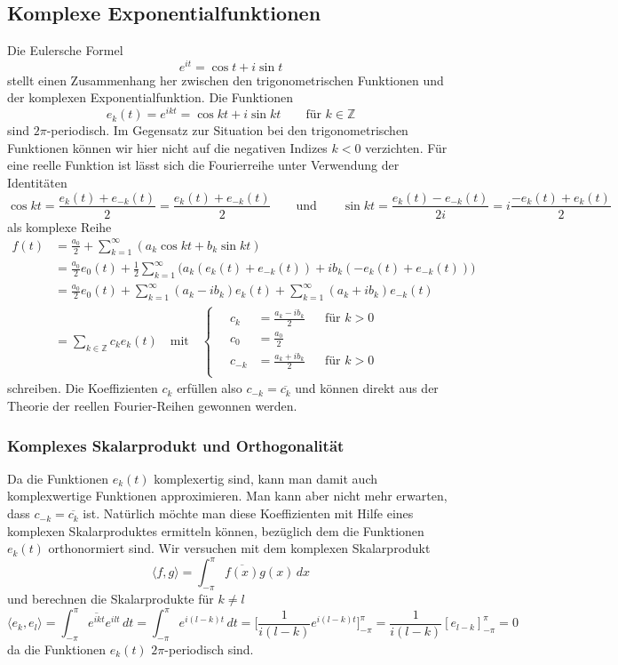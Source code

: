 \subsection{Komplexe Exponentialfunktionen}
Die Eulersche Formel
\[
e^{it} = \cos t + i\sin t
\]
stellt einen Zusammenhang her zwischen den trigonometrischen Funktionen
und der komplexen Exponentialfunktion.
Die Funktionen
\[
e_k(t) = e^{ikt} = \cos kt + i\sin kt\qquad\text{für $k\in\mathbb{Z}$}
\]
sind $2\pi$-periodisch.
Im Gegensatz zur Situation bei den trigonometrischen Funktionen können
wir hier nicht auf die negativen Indizes $k<0$ verzichten.
Für eine reelle Funktion ist lässt sich die Fourierreihe unter Verwendung
der Identitäten
\[
\cos kt
=
\frac{e_k(t) + e_{-k}(t)}{2}
=
\frac{e_k(t) + e_{-k}(t)}2
\qquad\text{und}\qquad
\sin kt
=
\frac{e_k(t) - e_{-k}(t)}{2i}
=
i\frac{-e_{k}(t)+e_k(t)}2
\]
als komplexe Reihe 
\begin{align*}
f(t)
&=
\frac{a_0}2
+\sum_{k=1}^\infty (a_k\cos kt + b_k \sin kt)
\\
&=
\frac{a_0}2 e_0(t)
+
\frac12
\sum_{k=1}^\infty
\bigl(
a_k(e_k(t)+e_{-k}(t))
+
ib_k(-e_k(t)+e_{-k}(t))
\bigr)
\\
&=
\frac{a_0}2e_0(t)
+
\sum_{k=1}^\infty (a_k-ib_k)e_k(t)
+
\sum_{k=1}^\infty (a_k+ib_k)e_{-k}(t)
\\
&=\sum_{k\in\mathbb{Z}} c_ke_k(t)
\quad\text{mit}\quad
\left\{\quad
\begin{aligned}
c_k    &= \frac{a_k-ib_k}2&&\text{für $k>0$}\\
c_0    &= \frac{a_0}2     &&                \\
c_{-k} &= \frac{a_k+ib_k}2&&\text{für $k>0$}\\
\end{aligned}
\right.
\end{align*}
schreiben.
Die Koeffizienten $c_k$ erfüllen also $c_{-k}=\overline{c_k}$
und können direkt aus der Theorie der reellen Fourier-Reihen
gewonnen werden.

%
%
\subsubsection{Komplexes Skalarprodukt und Orthogonalität}
Da die Funktionen $e_k(t)$ komplexertig sind, kann man damit
auch komplexwertige Funktionen approximieren. 
Man kann aber nicht mehr erwarten, dass $c_{-k}=\overline{c_k}$ ist.
Natürlich möchte man diese Koeffizienten mit Hilfe eines komplexen
Skalarproduktes ermitteln können, bezüglich dem die Funktionen $e_k(t)$
orthonormiert sind.
Wir versuchen mit dem komplexen Skalarprodukt
\begin{equation}
\langle f,g\rangle
=
\int_{-\pi}^\pi \overline{f(x)}g(x)\,dx
\label{buch:orthfunkt:komplexskalar}
\end{equation}
und berechnen die Skalarprodukte für $k\ne l$
\[
\langle e_k,e_l\rangle
=
\int_{-\pi}^\pi \overline{e^{ikt}} e^{ilt}\,dt
=
\int_{-\pi}^\pi e^{i(l-k)t}\,dt
=
\biggl[
\frac{1}{i(l-k)} e^{i(l-k)t}
\biggr]_{-\pi}^\pi
=
\frac{1}{i(l-k)}
[ e_{l-k} ]_{-\pi}^\pi
=
0
\]
da die Funktionen $e_k(t)$ $2\pi$-periodisch sind.

